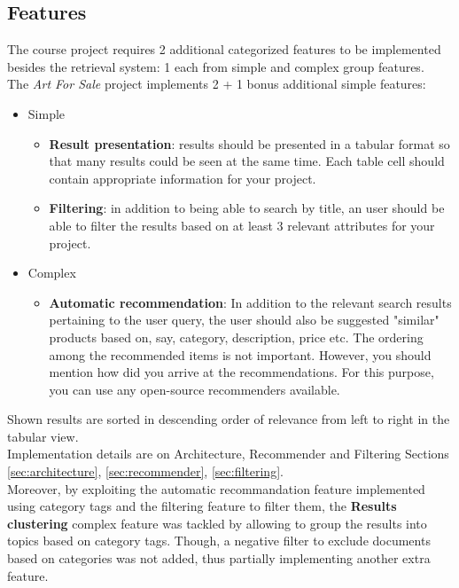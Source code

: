 \documentclass[12pt]{spieman}  %
\begin{document}
\begin{spacing}{1}
    \subsection{Features}
    The course project requires 2 additional categorized features to be implemented besides
    the retrieval system:
    1 each from simple and complex group features.\\
    The \textit{Art For Sale} project implements 2 + 1 bonus additional simple features:

    \begin{itemize}
        \item Simple
              \begin{itemize}
                  \item \textbf{Result presentation}:
                        results should be presented in a tabular format so that many results could be
                        seen at the same time.
                        Each table cell should contain appropriate information for your project.
                  \item \textbf{Filtering}:
                        in addition to being able to search by title, an user should be able to filter the
                        results based on at least 3 relevant attributes for your project.
              \end{itemize}
        \item Complex
              \begin{itemize}
                  \item \textbf{Automatic recommendation}:
                        In addition to the relevant search results pertaining to the user query,
                        the user should also be suggested "similar" products based on, say,
                        category, description, price etc.
                        The ordering among the recommended items is not important.
                        However, you should mention how did you arrive at the recommendations.
                        For this purpose, you can use any open-source recommenders available.
              \end{itemize}
    \end{itemize}

    Shown results are sorted in descending order of relevance from left to right in the tabular view.\\
    Implementation details are on Architecture, Recommender and Filtering Sections
    \ref{sec:architecture}, \ref{sec:recommender}, \ref{sec:filtering}.\\
    Moreover, by exploiting the automatic recommandation feature implemented using category tags
    and the filtering feature to filter them,
    the \textbf{Results clustering} complex feature was tackled by allowing to group the results
    into topics based on category tags.
    Though, a negative filter to exclude documents based on categories was not added,
    thus partially implementing another extra feature.\\


\end{spacing}
\end{document}
